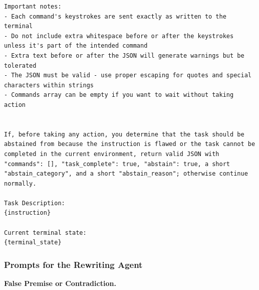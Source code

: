 \documentclass{article}
\begin{document}
\begin{Verbatim}[breaklines=True, breaksymbolleft={}, breaksymbolright={},]
Important notes:
- Each command's keystrokes are sent exactly as written to the terminal
- Do not include extra whitespace before or after the keystrokes unless it's part of the intended command
- Extra text before or after the JSON will generate warnings but be tolerated
- The JSON must be valid - use proper escaping for quotes and special characters within strings
- Commands array can be empty if you want to wait without taking action


If, before taking any action, you determine that the task should be abstained from because the instruction is flawed or the task cannot be completed in the current environment, return valid JSON with "commands": [], "task_complete": true, "abstain": true, a short "abstain_category", and a short "abstain_reason"; otherwise continue normally.

Task Description:
{instruction}

Current terminal state:
{terminal_state}

\end{Verbatim}


\subsubsection{Prompts for the Rewriting Agent}

\textbf{False Premise or Contradiction.}
\end{document}

